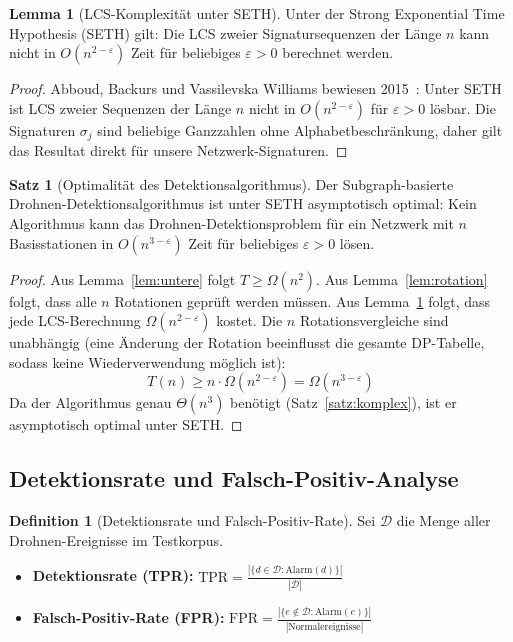 ﻿\documentclass[a4paper,12pt]{article}
\theoremstyle{definition}
\newtheorem{definition}{Definition}
\newtheorem{satz}{Satz}
\newtheorem{lemma}{Lemma}
\begin{document}
\begin{lemma}[LCS-Komplexit\"at unter SETH]
\label{lem:lcs}
    Unter der Strong Exponential Time Hypothesis (SETH) gilt: Die LCS zweier
    Signatursequenzen der L\"ange $n$ kann nicht in $O(n^{2-\varepsilon})$ Zeit
    f\"ur beliebiges $\varepsilon > 0$ berechnet werden.
\end{lemma}

\begin{proof}
    Abboud, Backurs und Vassilevska Williams bewiesen 2015~\cite{abboud2015}:
    Unter SETH ist LCS zweier Sequenzen der L\"ange $n$ nicht in
    $O(n^{2-\varepsilon})$ f\"ur $\varepsilon > 0$ l\"osbar.
    Die Signaturen $\sigma_j$ sind beliebige Ganzzahlen ohne Alphabetbeschr\"ankung,
    daher gilt das Resultat direkt f\"ur unsere Netzwerk-Signaturen.
\end{proof}

\begin{satz}[Optimalit\"at des Detektionsalgorithmus]
\label{satz:optimal}
    Der Subgraph-basierte Drohnen-Detektionsalgorithmus ist unter SETH
    asymptotisch optimal: Kein Algorithmus kann das Drohnen-Detektionsproblem
    f\"ur ein Netzwerk mit $n$ Basisstationen in $O(n^{3-\varepsilon})$ Zeit
    f\"ur beliebiges $\varepsilon > 0$ l\"osen.
\end{satz}

\begin{proof}
    Aus Lemma~\ref{lem:untere} folgt $T \geq \Omega(n^2)$.
    Aus Lemma~\ref{lem:rotation} folgt, dass alle $n$ Rotationen gepr\"uft werden m\"ussen.
    Aus Lemma~\ref{lem:lcs} folgt, dass jede LCS-Berechnung $\Omega(n^{2-\varepsilon})$
    kostet.
    Die $n$ Rotationsvergleiche sind unabh\"angig (eine \"Anderung der Rotation
    beeinflusst die gesamte DP-Tabelle, sodass keine Wiederverwendung m\"oglich ist):
    \[
    T(n) \geq n \cdot \Omega(n^{2-\varepsilon}) = \Omega(n^{3-\varepsilon})
    \]
    Da der Algorithmus genau $\Theta(n^3)$ ben\"otigt (Satz~\ref{satz:komplex}),
    ist er asymptotisch optimal unter SETH.
\end{proof}

\subsection{Detektionsrate und Falsch-Positiv-Analyse}

\begin{definition}[Detektionsrate und Falsch-Positiv-Rate]
    Sei $\mathcal{D}$ die Menge aller Drohnen-Ereignisse im Testkorpus.
    \begin{itemize}
        \item \textbf{Detektionsrate (TPR):}
              $\mathrm{TPR} = \frac{|\{d \in \mathcal{D} : \text{Alarm}(d)\}|}{|\mathcal{D}|}$
        \item \textbf{Falsch-Positiv-Rate (FPR):}
              $\mathrm{FPR} = \frac{|\{e \notin \mathcal{D} : \text{Alarm}(e)\}|}{|\text{Normalereignisse}|}$
    \end{itemize}
\end{definition}
\end{document}
